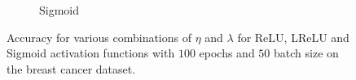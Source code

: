 \documentclass[%
reprint,s
amsmath,amssymb,
aps,
]{revtex4-2}
\begin{document}
\begin{figure}[ht!]
\begin{subfigure}{0.41\textwidth}
		\caption{Sigmoid}
		\label{fig:Sigmoid_heatmap}
	\end{subfigure}
	\caption{Accuracy for various combinations of $\eta$ and $\lambda$ for ReLU, LReLU and Sigmoid activation functions with $100$ epochs and $50$ batch size on the breast cancer dataset.}
	\label{fig:FFNN_cancer_heatmaps}
\end{figure}


\end{document}
